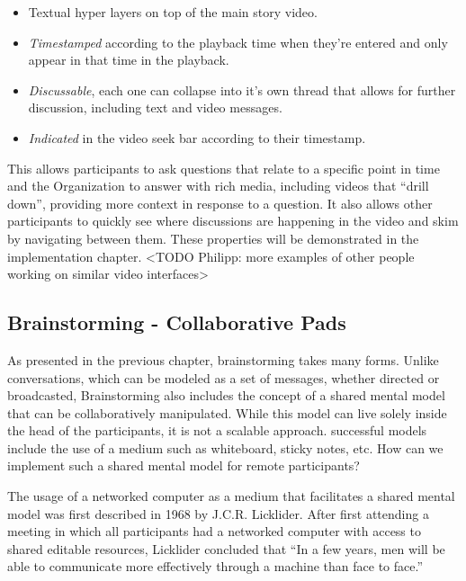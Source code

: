 \begin{itemize}

\item Textual hyper layers on top of the main story video. 

\item \textit{Timestamped} according to the playback time when they're entered and only appear in that time in the playback. 

\item \textit{Discussable}, each one can collapse into it's own thread that allows for further discussion, including text and video messages. 

\item \textit{Indicated} in the video seek bar according to their timestamp.

\end{itemize}

This allows participants to ask questions that relate to a specific point in time and the Organization to answer with rich media, including videos that “drill down”, providing more context in response to a question. It also allows other participants to quickly see where discussions are happening in the video and skim by navigating between them. These properties will be demonstrated in the implementation chapter. <TODO Philipp: more examples of other people working on similar video interfaces>

\subsection{Brainstorming - Collaborative Pads}

As presented in the previous chapter, brainstorming takes many forms. Unlike conversations, which can be modeled as a set of messages, whether directed or broadcasted, Brainstorming also includes the concept of a shared mental model that can be collaboratively manipulated. While this model can live solely inside the head of the participants, it is not a scalable approach. successful models include the use of a medium such as whiteboard, sticky notes, etc. How can we implement such a shared mental model for remote participants?

The usage of a networked computer as a medium that facilitates a shared mental model was first described in 1968 by J.C.R. Licklider. After first attending a meeting in which all participants had a networked computer with access to shared editable resources, Licklider concluded that ``In a few years, men will be able to communicate more effectively through a machine than face to face.''\cite{licklider1968computer}


